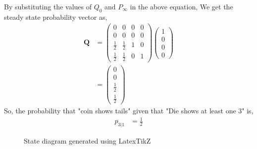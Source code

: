 \documentclass[journal,12pt,two column]{IEEEtran}
\newcommand{\myvec}[1]{\ensuremath{\begin{pmatrix}#1\end{pmatrix}}}
\let\vec\mathbf
\begin{document}
By substituting the values of $Q_0$ and $P_\infty$ in the above equation, We get the steady state probability vector as,
\begin{align}
    \vec{Q}&=\myvec{0&0&0&0\\0&0&0&0\\\frac{1}{2}&\frac{1}{2}&1&0\\\frac{1}{2}&\frac{1}{2}&0&1}\myvec{1\\0\\0\\0}\\
    &=\myvec{0\\0\\\frac{1}{2}\\\frac{1}{2}}
\end{align}
So, the probability that "coin shows tails" given that "Die shows at least one 3" is,
\begin{align}
    p_{3|1} &= \frac{1}{2}
\end{align}
\begin{figure}[ht!]
    \centering
    \resizebox{\linewidth}{!}{}
    \caption{State diagram generated using LatexTikZ}
    \label{fig:Statediagramdiecoin}
\end{figure}
\end{document}
